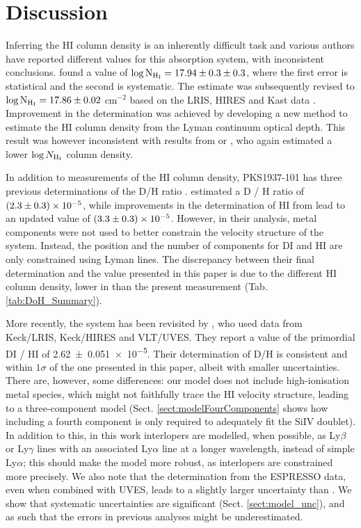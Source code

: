 \documentclass[fleqn,usenatbib]{mnras}
\makeatletter
\DeclareRobustCommand{\ion}[2]{%
  \mbox{#1\check@mathfonts\fontsize\sf@size\z@\selectfont #2}%
}
\makeatother
\begin{document}
\section{Discussion}
\label{sec:comparisonWithOtherModels}
Inferring the \ion{H}{I} column density is an inherently difficult task and various authors have reported different values for this absorption system, with inconsistent conclusions. \citet{tytler_96} found a value of $\log{\rm N_{H_I}} = 17.94 \pm 0.3 \pm 0.3$, where the first error is statistical and the second is systematic. The estimate was subsequently revised to $\log{\rm N_{H_I}} = 17.86 \pm 0.02$ cm$^{-2}$ based on the LRIS, HIRES and Kast data \citep{burles_tytler_hydrogen}. Improvement in the determination was achieved by developing a new method to estimate the \ion{H}{I} column density from the Lyman continuum optical depth. This result was however inconsistent with results from \citet[$\log{N_{\rm H_I}}<17.7$ cm$^{-2}$]{songaila_97} or \citet{wampler_96}, who again estimated a lower $\log{N_{\rm H_I}}$ column density.

In addition to measurements of the \ion{H}{I} column density, PKS1937-101 has three previous determinations of the D/H ratio \citep{tytler_96, burles_tytler_98, RS_17}. \citet{tytler_96} estimated a \ion{D}{}/\ion{H}{} ratio of $\num{2.3 \pm .3e-5}$, while improvements in the determination of \ion{H}{I} from \citet{burles_tytler_98} lead to an updated value of $\num{3.3 \pm .3e-5}$. However, in their analysis, metal components were not used to better constrain the velocity structure of the system. Instead, the position and the number of components for \ion{D}{I} and \ion{H}{I} are only constrained using Lyman lines. The discrepancy between their final determination and the value presented in this paper is due to the different \ion{H}{I} column density, lower in \citet{burles_tytler_98} than the present measurement (Tab. \ref{tab:DoH_Summary}).

More recently, the system has been revisited by , who used data from Keck/LRIS, Keck/HIRES and VLT/UVES. They report a value of the primordial \ion{D}{I}/\ion{H}{I} of \num{2.62 \pm 0.051e-5}. Their determination of D/H is consistent and within $1\sigma$ of the one presented in this paper, albeit with smaller uncertainties. There are, however, some differences: our model does not include high-ionisation metal species, which might not faithfully trace the \ion{H}{I} velocity structure, leading to a three-component model (Sect. \ref{sect:modelFourComponents} shows how including a fourth component is only required to adequately fit the \ion{Si}{IV} doublet). In addition to this, in this work interlopers are modelled, when possible, as Ly$\beta$ or Ly$\gamma$ lines with an associated Ly$\alpha$ line at a longer wavelength, instead of simple Ly$\alpha$; this should make the model more robust, as interlopers are constrained more precisely.
We also note that the determination from the ESPRESSO data, even when combined with UVES, leads to a slightly larger uncertainty than . We show that systematic uncertainties are significant (Sect. \ref{sect:model_unc}), and as such that the errors in previous analyses might be underestimated. 
\end{document}

